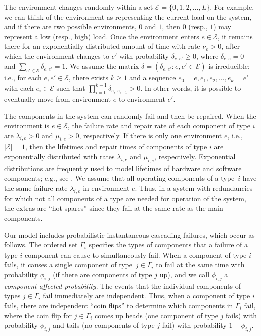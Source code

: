 \documentclass[12pt]{article}
\begin{document}
The environment changes randomly within a set $\mathcal{E} = \{ 0, 1, 2, \ldots,
L \}$. For example, we can think of the environment as representing the current
load on the system, and if there are two possible environments, $0$ and $1$,
then $0$ (resp., $1$) may represent a low (resp., high) load. Once the
environment enters $e \in \mathcal{E}$, it remains there for an exponentially
distributed amount of time with rate $\nu_e > 0$, after which the environment
changes to $e'$ with probability $\delta_{e, e'} \geq 0$, where $\delta_{e, e} =
0$ and $\sum_{e' \in \mathcal{E}} \delta_{e, e'} = 1$. We assume the matrix
$\delta = (\delta_{e, e'} : e, e' \in \mathcal{E})$ is irreducible; i.e., for
each $e, e' \in \mathcal{E}$, there exists $k \geq 1$ and a sequence $e_0 = e,
e_1, e_2, \ldots, e_k = e'$ with each $e_i \in \mathcal{E}$ such that $\prod_{i
= 0}^{k-1} \delta_{e_i, e_{i + 1}} > 0$. In other words, it is possible to
eventually move from environment $e$ to environment $e'$.

The components in the system can randomly fail and then be repaired. When the
environment is $e \in \mathcal{E}$, the failure rate and repair rate of each
component of type $i$ are $\lambda_{i, e} > 0$ and $\mu_{i, e} > 0$,
respectively.  If there is only one environment $e$, i.e., $| \mathcal{E} | =
1$, then the lifetimes and repair times of components of type $i$ are
exponentially distributed with rates $\lambda_{i, e}$ and $\mu_{i, e}$,
respectively. Exponential distributions are frequently used to model lifetimes
of hardware and software components; e.g., see \cite{XDP:2004}. We assume that
all operating components of a type~$i$ have the same failure rate $\lambda_{i,
e}$ in environment $e$. Thus, in a system with  redundancies for which not all
components of a type are needed for operation of the system, the extras are
``hot spares'' since they fail at the same rate as the main components.

Our model includes probabilistic instantaneous cascading failures, which occur
as follows. The ordered set $\Gamma_i$ specifies the types of components that a
failure of a type-$i$ component can cause to simultaneously fail. When a
component of type $i$ fails, it causes a single  component of type~$j \in
\Gamma_i$ to fail at the same time with probability $\phi_{i, j}$ (if there are
components of type $j$ up), and we call
$\phi_{i, j}$  a \textit{component-affected probability}. The events that the individual components of types $j \in
\Gamma_i$ fail immediately are independent. Thus, when a component of type $i$
fails, there are independent ``coin flips'' to determine which components in
$\Gamma_i$ fail, where the coin flip for $j \in \Gamma_i$ comes up heads (one
component of type $j$ fails) with probability $\phi_{i, j}$ and tails (no
components of type $j$ fail) with probability $1 - \phi_{i, j}$.
\end{document}
